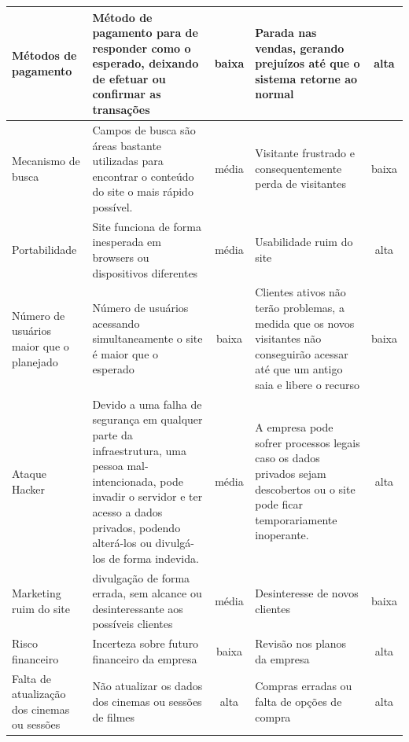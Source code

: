 \documentclass[12pt]{article}
\begin{document}
\begin{center}
\begin{longtable}{|p{2.0cm}|p{3.2cm}|c|p{3.2cm}|c|}
                Métodos de pagamento & Método de pagamento para de responder como o esperado, deixando de efetuar ou confirmar as transações & baixa & Parada nas vendas, gerando prejuízos até que o sistema retorne ao normal & alta  \\ \hline
                
                Mecanismo de busca & Campos de busca são áreas bastante utilizadas para encontrar o conteúdo do site o mais rápido possível. & média  & Visitante frustrado e consequentemente perda de visitantes  & baixa  \\ \hline
                
                Portabilidade & Site funciona de forma inesperada em browsers ou dispositivos diferentes & média & Usabilidade ruim do site & alta \\ \hline
                
                Número de usuários maior que o planejado & Número de usuários acessando simultaneamente o site é maior que o esperado & baixa & Clientes ativos não terão problemas, a medida que os novos visitantes não conseguirão acessar até que um antigo saia e libere o recurso & baixa \\ \hline
                
                Ataque Hacker & Devido a uma falha de segurança em qualquer parte da infraestrutura, uma pessoa mal-intencionada, pode invadir o servidor e ter acesso a dados privados, podendo alterá-los ou divulgá-los de forma indevida. & média & A empresa pode sofrer processos legais caso os dados privados sejam descobertos ou o site pode ficar temporariamente inoperante. & alta \\ \hline 
                
                Marketing ruim do site & divulgação de forma errada, sem alcance ou desinteressante aos possíveis clientes & média & Desinteresse de novos clientes & baixa  \\ \hline
                
                Risco financeiro & Incerteza sobre futuro financeiro da empresa & baixa & Revisão nos planos da empresa & alta  \\ \hline 
                
                Falta de atualização dos cinemas ou sessões & Não atualizar os dados dos cinemas ou sessões de filmes & alta & Compras erradas ou falta de opções de compra & alta  \\ \hline 
                

\end{longtable}
\end{center}
\end{document}
